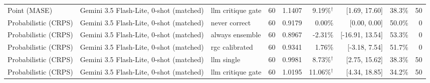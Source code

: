 \begin{tabular}{lllrrrrrr}
Point (MASE) & Gemini 3.5 Flash-Lite, 0-shot (matched) & llm critique gate & 60 & 1.1407 & 9.19\%$^\dagger$ & [1.69, 17.60] & 38.3\% & 50 \\
Probabilistic (CRPS) & Gemini 3.5 Flash-Lite, 0-shot (matched) & never correct & 60 & 0.9179 & 0.00\% & [0.00, 0.00] & 50.0\% & 0 \\
Probabilistic (CRPS) & Gemini 3.5 Flash-Lite, 0-shot (matched) & always ensemble & 60 & 0.8967 & -2.31\% & [-16.91, 13.54] & 53.3\% & 0 \\
Probabilistic (CRPS) & Gemini 3.5 Flash-Lite, 0-shot (matched) & rgc calibrated & 60 & 0.9341 & 1.76\% & [-3.18, 7.54] & 51.7\% & 0 \\
Probabilistic (CRPS) & Gemini 3.5 Flash-Lite, 0-shot (matched) & llm single & 60 & 0.9981 & 8.73\%$^\dagger$ & [2.75, 15.62] & 38.3\% & 50 \\
Probabilistic (CRPS) & Gemini 3.5 Flash-Lite, 0-shot (matched) & llm critique gate & 60 & 1.0195 & 11.06\%$^\dagger$ & [4.34, 18.85] & 34.2\% & 50 \\
\bottomrule
\end{tabular}
